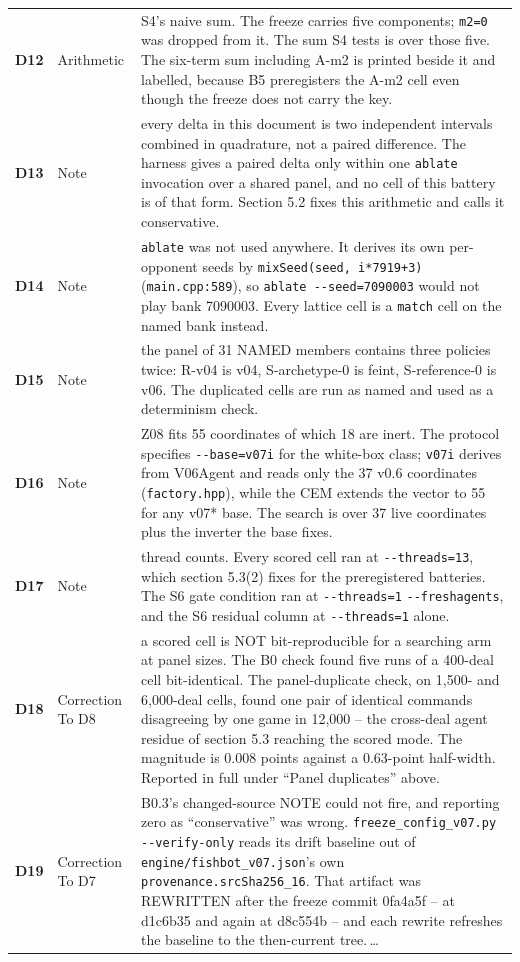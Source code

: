 \begin{xltabular}{\linewidth}{@{}l l L@{}}
\textbf{D12} & Arithmetic & S4's naive sum. The freeze carries five components; \texttt{m2=0} was dropped from it. The sum S4 tests is over those five. The six-term sum including A-m2 is printed beside it and labelled, because B5 preregisters the A-m2 cell even though the freeze does not carry the key. \\
\textbf{D13} & Note & every delta in this document is two independent intervals combined in quadrature, not a paired difference. The harness gives a paired delta only within one \texttt{ablate} invocation over a shared panel, and no cell of this battery is of that form. Section 5.2 fixes this arithmetic and calls it conservative. \\
\textbf{D14} & Note & \texttt{ablate} was not used anywhere. It derives its own per-opponent seeds by \texttt{mixSeed(seed, i*7919+3)} (\texttt{main.cpp:589}), so \texttt{ablate -{}-seed=7090003} would not play bank 7090003. Every lattice cell is a \texttt{match} cell on the named bank instead. \\
\textbf{D15} & Note & the panel of 31 NAMED members contains three policies twice: R-v04 is v04, S-archetype-0 is feint, S-reference-0 is v06. The duplicated cells are run as named and used as a determinism check. \\
\textbf{D16} & Note & Z08 fits 55 coordinates of which 18 are inert. The protocol specifies \texttt{-{}-base=v07i} for the white-box class; \texttt{v07i} derives from V06Agent and reads only the 37 v0.6 coordinates (\texttt{factory.hpp}), while the CEM extends the vector to 55 for any v07* base. The search is over 37 live coordinates plus the inverter the base fixes. \\
\textbf{D17} & Note & thread counts. Every scored cell ran at \texttt{-{}-threads=13}, which section 5.3(2) fixes for the preregistered batteries. The S6 gate condition ran at \texttt{-{}-threads=1} \texttt{-{}-freshagents}, and the S6 residual column at \texttt{-{}-threads=1} alone. \\
\textbf{D18} & Correction To D8 & a scored cell is NOT bit-reproducible for a searching arm at panel sizes. The B0 check found five runs of a 400-deal cell bit-identical. The panel-duplicate check, on 1,500- and 6,000-deal cells, found one pair of identical commands disagreeing by one game in 12,000 -- the cross-deal agent residue of section 5.3 reaching the scored mode. The magnitude is 0.008 points against a 0.63-point half-width. Reported in full under ``Panel duplicates'' above. \\
\textbf{D19} & Correction To D7 & B0.3's changed-source NOTE could not fire, and reporting zero as ``conservative'' was wrong. \texttt{freeze\_config\_v07.py -{}-verify-only} reads its drift baseline out of \texttt{engine/fishbot\_v07.json}'s own \texttt{provenance.srcSha256\_16}. That artifact was REWRITTEN after the freeze commit 0fa4a5f -- at d1c6b35 and again at d8c554b -- and each rewrite refreshes the baseline to the then-current tree.\,\ldots \\

\end{xltabular}
